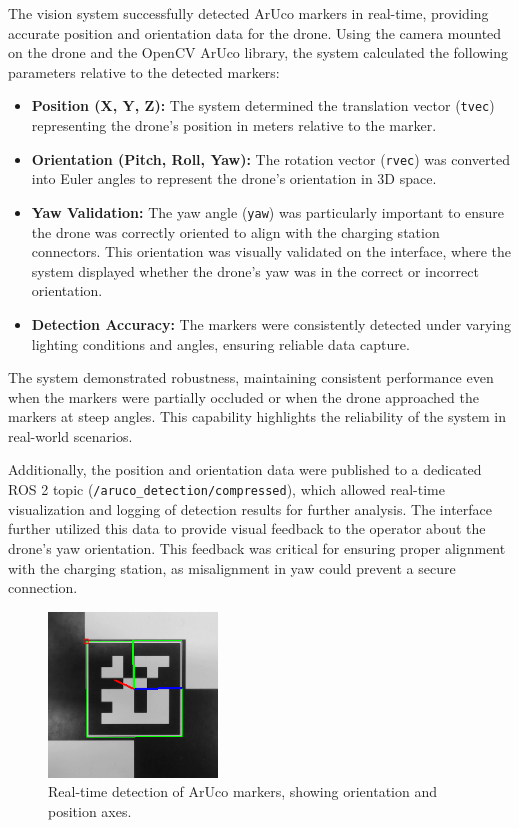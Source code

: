 The vision system successfully detected ArUco markers in real-time, providing accurate position and orientation data for the drone. Using the camera mounted on the drone and the OpenCV ArUco library, the system calculated the following parameters relative to the detected markers:
\begin{itemize}
    \item \textbf{Position (X, Y, Z):} The system determined the translation vector (\texttt{tvec}) representing the drone's position in meters relative to the marker.
    \item \textbf{Orientation (Pitch, Roll, Yaw):} The rotation vector (\texttt{rvec}) was converted into Euler angles to represent the drone's orientation in 3D space.
    \item \textbf{Yaw Validation:} The yaw angle (\texttt{yaw}) was particularly important to ensure the drone was correctly oriented to align with the charging station connectors. This orientation was visually validated on the interface, where the system displayed whether the drone's yaw was in the correct or incorrect orientation.
    \item \textbf{Detection Accuracy:} The markers were consistently detected under varying lighting conditions and angles, ensuring reliable data capture.
\end{itemize}

The system demonstrated robustness, maintaining consistent performance even when the markers were partially occluded or when the drone approached the markers at steep angles. This capability highlights the reliability of the system in real-world scenarios.

Additionally, the position and orientation data were published to a dedicated ROS 2 topic (\texttt{/aruco\_detection/compressed}), which allowed real-time visualization and logging of detection results for further analysis. The interface further utilized this data to provide visual feedback to the operator about the drone's yaw orientation. This feedback was critical for ensuring proper alignment with the charging station, as misalignment in yaw could prevent a secure connection.

\begin{figure}[H]
    \centering
    \includegraphics[width=0.4\textwidth]{pictures/aruco_detection.png}
    \caption{Real-time detection of ArUco markers, showing orientation and position axes.}
    \label{fig:aruco_detection_results}
\end{figure}

